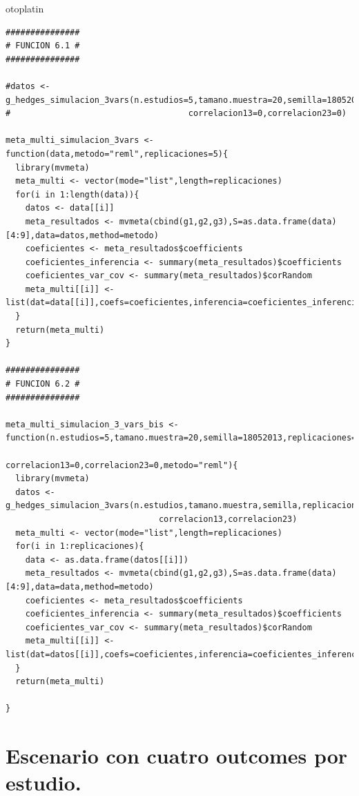 otoplatin\documentclass[a4paper,openright,12pt]{report}
\begin{document}
{\begin{verbatim}
###############
# FUNCION 6.1 #
###############

#datos <- g_hedges_simulacion_3vars(n.estudios=5,tamano.muestra=20,semilla=18052013,replicaciones=5,correlacion12=0,
#                                    correlacion13=0,correlacion23=0)

meta_multi_simulacion_3vars <- function(data,metodo="reml",replicaciones=5){
  library(mvmeta)
  meta_multi <- vector(mode="list",length=replicaciones)
  for(i in 1:length(data)){
    datos <- data[[i]]
    meta_resultados <- mvmeta(cbind(g1,g2,g3),S=as.data.frame(data)[4:9],data=datos,method=metodo)
    coeficientes <- meta_resultados$coefficients
    coeficientes_inferencia <- summary(meta_resultados)$coefficients
    coeficientes_var_cov <- summary(meta_resultados)$corRandom
    meta_multi[[i]] <- list(dat=data[[i]],coefs=coeficientes,inferencia=coeficientes_inferencia,var_cov=coeficientes_var_cov)
  }
  return(meta_multi)  
}

###############
# FUNCION 6.2 #
###############

meta_multi_simulacion_3_vars_bis <- function(n.estudios=5,tamano.muestra=20,semilla=18052013,replicaciones=5,correlacion12=0,
                                      correlacion13=0,correlacion23=0,metodo="reml"){
  library(mvmeta)
  datos <- g_hedges_simulacion_3vars(n.estudios,tamano.muestra,semilla,replicaciones,correlacion12,
                               correlacion13,correlacion23)
  meta_multi <- vector(mode="list",length=replicaciones)
  for(i in 1:replicaciones){
    data <- as.data.frame(datos[[i]])
    meta_resultados <- mvmeta(cbind(g1,g2,g3),S=as.data.frame(data)[4:9],data=data,method=metodo)
    coeficientes <- meta_resultados$coefficients
    coeficientes_inferencia <- summary(meta_resultados)$coefficients
    coeficientes_var_cov <- summary(meta_resultados)$corRandom
    meta_multi[[i]] <- list(dat=datos[[i]],coefs=coeficientes,inferencia=coeficientes_inferencia,var_cov=coeficientes_var_cov)
  }
  return(meta_multi)  
  
}
\end{verbatim}}

\section{Escenario con cuatro outcomes por estudio.}
\end{document}
